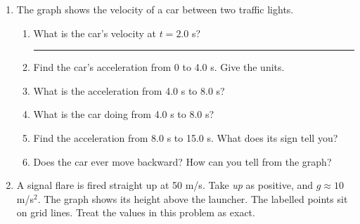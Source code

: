 \documentclass[12pt, twoside]{article}
\newcommand{\blank}[1][2.4cm]{\rule{#1}{0.4pt}}
\begin{document}
\begin{enumerate}[itemsep=0.6cm]
\newpage

\item The graph shows the velocity of a car between two traffic lights.

  \begin{center}
  \end{center}

  \begin{enumerate}[itemsep=0.4cm]
    \item What is the car's velocity at $t = 2.0$ s? \hfill \blank
      \vspace{0.4cm}
    \item Find the car's acceleration from 0 to 4.0 s. Give the units.
      \vspace{2.2cm}
    \item What is the acceleration from 4.0 s to 8.0 s?
      \vspace{0.8cm}
    \item What is the car doing from 4.0 s to 8.0 s?
      \vspace{0.8cm}
    \item Find the acceleration from 8.0 s to 15.0 s. What does its sign tell you?
      \vspace{2.2cm}
    \item Does the car ever move backward? How can you tell from the graph?
  \end{enumerate}

\newpage

\item A signal flare is fired straight up at 50 m/s. Take \emph{up} as positive, and
  $g \approx 10$ m/s$^2$. The graph shows its height above the launcher. The
  labelled points sit on grid lines. Treat the values in this problem as exact.


\end{enumerate}
\end{document}
